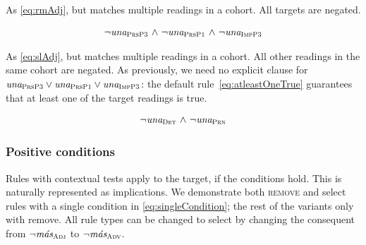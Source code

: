 



 As \ref{eq:rmAdj}, but matches multiple readings in a cohort. All targets are negated.

\begin{equation}
\begin{array}{c @{~\wedge~} c @{~\wedge~} c}
\neg{} \unaPrsPThree  & \neg \unaPrsPOne & \neg \unaImp
\end{array}
\label{eq:rmVb}
\end{equation}

 As \ref{eq:slAdj}, but matches multiple readings in a cohort. All other readings in the same cohort are negated.
As previously, we need no explicit clause for $\text{\em una}_{\text{\sc PrsP3}}  \vee \text{\em una}_{\text{\sc PrsP1}} \vee \text{\em una}_{\text{\sc ImpP3}}$: the default rule~\ref{eq:atleastOneTrue} guarantees that at least one of the target readings is true.

\begin{equation}
\begin{array}{c @{~\wedge~} c}
\neg \unaDet & \neg \unaPrn \\
\end{array}
\label{eq:slVb}
\end{equation}


\subsubsection{Positive conditions} 

Rules with contextual tests apply to the target, if the conditions hold. 
This is naturally represented as implications. We demonstrate both \textsc{remove} and {\sc select} rules with a single condition in \ref{eq:singleCondition}; the rest of the variants only with {\sc remove}. All rule types can be changed to {\sc select} by changing the consequent from $\neg{}\text{\em m\'{a}s}_{\text{\sc Adj}}$ to $\neg{}\text{\em m\'{a}s}_{\text{\sc Adv}}$. %


